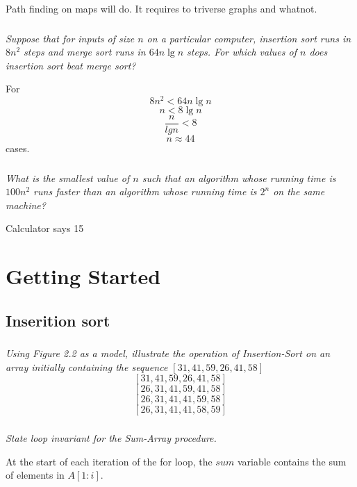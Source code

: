 \documentclass[11pt,oneside,titlepage]{book}
\begin{document}
Path finding on maps will do. It requires to triverse graphs and whatnot.

\subsection{}

\textit{Suppose that for inputs of size $n$ on a particular computer, insertion sort
  runs in $8n^2$ steps and merge sort runs in $64n \lg n$ steps. For which values of $n$
  does insertion sort beat merge sort?}

For
$$8 n^2 < 64 n \lg n$$
$$n <8 \lg n$$
$$\frac{n}{lg n} < 8$$
$$n \approx 44$$
cases.


\subsection{}

\textit{What is the smallest value of $n$ such that an algorithm whose running time is $100n^2$
  runs faster than an algorithm whose running time is $2^n$ on the same machine?}

Calculator says 15

\chapter{Getting Started}


\section{Inserition sort}

\subsection{}

\textit{Using Figure 2.2 as a model, illustrate the operation of Insertion-Sort on an
  array initially containing the sequence $[31, 41, 59, 26, 41, 58]$}
$$[31, 41, 59, 26, 41, 58]$$
$$[26, 31, 41, 59, 41, 58]$$
$$[26, 31, 41, 41, 59, 58]$$
$$[26, 31, 41, 41, 58, 59]$$

\subsection{}

\textit{State loop invariant for the Sum-Array procedure.}

At the start of each iteration of the for loop, the $sum$ variable contains the sum of elements
in $A[1: i]$.
\end{document}
